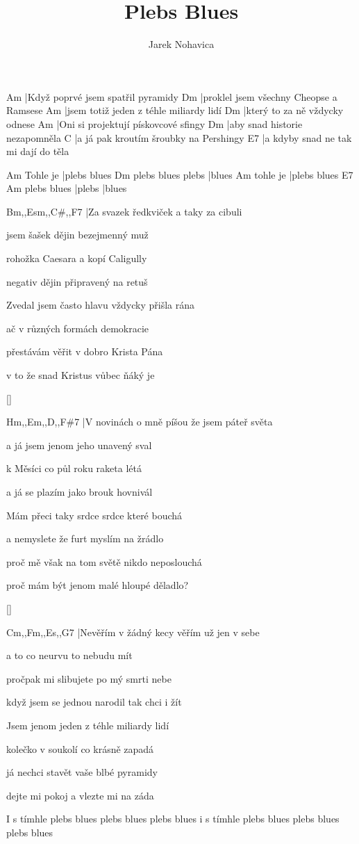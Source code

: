 \documentclass{song}
\title{Plebs Blues}
\author{Jarek Nohavica}
\begin{document}
\begin{multicols}{2}

\strophe
Am
|Když poprvé jsem spatřil pyramidy
Dm
|proklel jsem všechny Cheopse a Ramsese
Am
|jsem totiž jeden z téhle miliardy lidí
Dm
|který to za ně vždycky odnese
Am
|Oni si projektují pískovcové sfingy
Dm
|aby snad historie nezapomněla
C
|a já pak kroutím šroubky na Pershingy
E7
|a kdyby snad ne tak mi dají do těla
\endstrophe

         Am
Tohle je |plebs blues
                  Dm
plebs blues plebs |blues
         Am
tohle je |plebs blues
            E7    Am
plebs blues |plebs |blues
\endstrophe


\strophe
Bm,,Esm,,C\#,,F7
|Za svazek ředkviček a taky za cibuli

jsem šašek dějin bezejmenný muž

rohožka Caesara a kopí Caligully

negativ dějin připravený na retuš

Zvedal jsem často hlavu vždycky přišla rána

ač v různých formách demokracie

přestávám věřit v dobro Krista Pána

v to že snad Kristus vůbec ňáký je
\endstrophe

\ref{}

\columnbreak

\strophe
Hm,,Em,,D,,F\#7
|V novinách o mně píšou že jsem páteř světa

a já jsem jenom jeho unavený sval

k Měsíci co půl roku raketa létá

a já se plazím jako brouk hovnivál

Mám přeci taky srdce srdce které bouchá

a nemyslete že furt myslím na žrádlo

proč mě však na tom světě nikdo neposlouchá

proč mám být jenom malé hloupé děladlo?
\endstrophe

\ref{}

\strophe
Cm,,Fm,,Es,,G7
|Nevěřím v žádný kecy věřím už jen v sebe

a to co neurvu to nebudu mít

pročpak mi slibujete po mý smrti nebe

když jsem se jednou narodil tak chci i žít

Jsem jenom jeden z téhle miliardy lidí

kolečko v soukolí co krásně zapadá

já nechci stavět vaše blbé pyramidy

dejte mi pokoj a vlezte mi na záda
\endstrophe

I s tímhle plebs blues
plebs blues plebs blues
i s tímhle plebs blues
plebs blues plebs blues
\endstrophe

\end{multicols}
\end{document}

